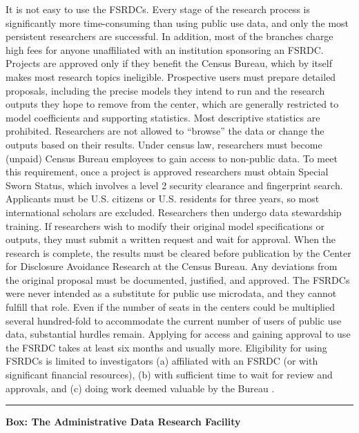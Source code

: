 \documentclass[]{krantz}
\begin{document}
It is not easy to use the FSRDCs. Every stage of the research process is
significantly more time-consuming than using public use data, and only
the most persistent researchers are successful. In addition, most of the
branches charge high fees for anyone unaffiliated with an institution
sponsoring an FSRDC. Projects are approved only if they benefit the
Census Bureau, which by itself makes most research topics ineligible.
Prospective users must prepare detailed proposals, including the precise
models they intend to run and the research outputs they hope to remove
from the center, which are generally restricted to model coefficients
and supporting statistics. Most descriptive statistics are prohibited.
Researchers are not allowed to ``browse'' the data or change the outputs
based on their results. Under census law, researchers must become
(unpaid) Census Bureau employees to gain access to non-public data. To
meet this requirement, once a project is approved researchers must
obtain Special Sworn Status, which involves a level 2 security clearance
and fingerprint search. Applicants must be U.S. citizens or U.S.
residents for three years, so most international scholars are excluded.
Researchers then undergo data stewardship training. If researchers wish
to modify their original model specifications or outputs, they must
submit a written request and wait for approval. When the research is
complete, the results must be cleared before publication by the Center
for Disclosure Avoidance Research at the Census Bureau. Any deviations
from the original proposal must be documented, justified, and approved.
The FSRDCs were never intended as a substitute for public use microdata,
and they cannot fulfill that role. Even if the number of seats in the
centers could be multiplied several hundred-fold to accommodate the
current number of users of public use data, substantial hurdles remain.
Applying for access and gaining approval to use the FSRDC takes at least
six months and usually more. Eligibility for using FSRDCs is limited to
investigators (a) affiliated with an FSRDC (or with significant
financial resources), (b) with sufficient time to wait for review and
approvals, and (c) doing work deemed valuable by the Bureau
\citep{UnivTaskForceonDifferentialPrivacyforCensusData2019}.

\begin{center}\rule{0.5\linewidth}{\linethickness}\end{center}

\textbf{Box: The Administrative Data Research Facility}
\end{document}
